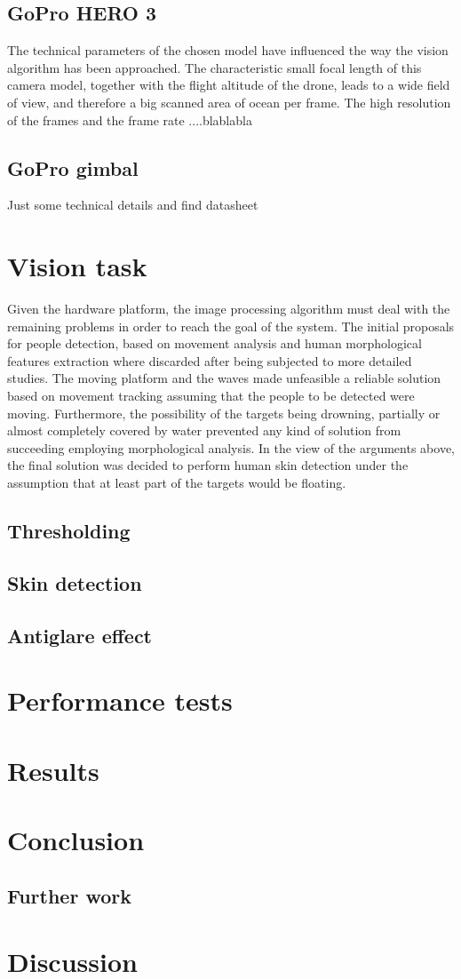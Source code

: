 \subsection{GoPro HERO 3}
The technical parameters of the chosen model have influenced the way the vision algorithm has been approached.
The characteristic small focal length of this camera model, together with the flight altitude of the drone, leads to a wide field of view, and therefore a big scanned area of ocean per frame. The high resolution of the frames and the frame rate ....blablabla

\subsection{GoPro gimbal }
Just some technical details and find datasheet


\section{Vision task}
Given the hardware platform, the image processing algorithm must deal with the remaining problems in order to reach the goal of the system. 
The initial proposals for people detection, based on movement analysis and human morphological features extraction where discarded after being subjected to more detailed studies. 
The moving platform and the waves made unfeasible a reliable solution based on movement tracking assuming that the people to be detected were moving.
Furthermore, the possibility of the targets being drowning, partially or almost completely covered by water prevented any kind of solution from succeeding employing morphological analysis. 
In the view of the arguments above, the final solution was decided to perform human skin detection under the assumption that at least part of the targets would be floating. 


\subsection{Thresholding}
\subsection{Skin detection}
\subsection{Antiglare effect}
\section{Performance tests}
\section{Results}
\section{Conclusion}
\subsection{Further work}
\section{Discussion}
\newpage